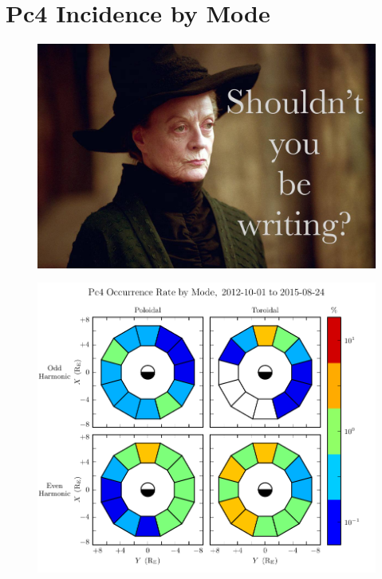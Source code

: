 \section{Pc4 Incidence by Mode}
  \label{sec_rate}

\begin{figure}[!htb]
    \centering
    \includegraphics[width=\textwidth]{figures/placeholder.jpg}
    \caption[Distribution of Events by Spectral Width]{
    }
    \label{fig_fwhm}
\end{figure}






\begin{figure}[!htb]
    \centering
    \includegraphics[width=\textwidth]{figures/rate.pdf}
    \caption[Pc4 Incidence by Mode]{
      \todo{$\cdots$}
    }
    \label{fig_rate}
\end{figure}



